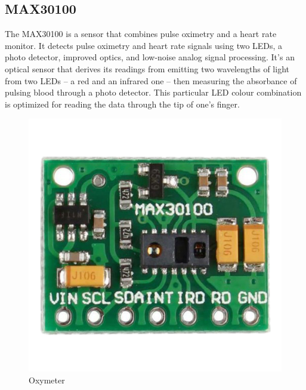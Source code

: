 \documentclass[a4paper,12pt]{report}
\begin{document}
\subsection{MAX30100}
The MAX30100 is a sensor that combines pulse oximetry and a heart rate monitor. It
detects pulse oximetry and heart rate signals using two LEDs, a photo detector, improved
optics, and low-noise analog signal processing. It’s an optical sensor that derives its readings
from emitting two wavelengths of light from two LEDs – a red and an infrared one – then
measuring the absorbance of pulsing blood through a photo detector. This particular LED
colour combination is optimized for reading the data through the tip of one’s finger.
 \begin{figure}[h] %
   \begin{center}
   \includegraphics[scale=0.3]{oxi.png}
   \caption{Oxymeter}
  \end{center}
  \end{figure}
  \
\end{document}
